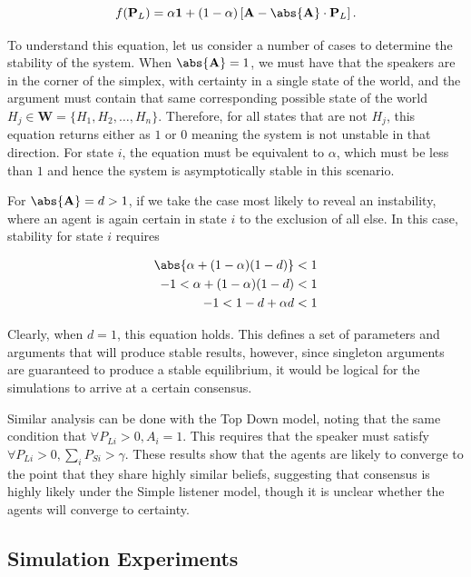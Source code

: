 \begin{equation*}
    f(\mathbf{P}_L) = \alpha \mathbf{1} + (1- \alpha) \left[ \mathbf{A} - \abs{ \mathbf{A}} \cdot \mathbf{P}_L \right] .
\end{equation*}

To understand this equation, let us consider a number of cases to determine the stability of the system. When $\abs{\mathbf{A}} = 1$, we must have that the speakers are in the corner of the simplex, with certainty in a single state of the world, and the argument must contain that same corresponding possible state of the world $H_j \in \mathbf{W} = \{H_1, H_2, \dots, H_n\}$. Therefore, for all states that are not $H_j$, this equation returns either as $1$ or $0$ meaning the system is not unstable in that direction. For state $i$, the equation must be equivalent to $\alpha$, which must be less than $1$ and hence the system is asymptotically stable in this scenario. 

For $\abs{\mathbf{A}} = d > 1$, if we take the case most likely to reveal an instability, where an agent is again certain in state $i$ to the exclusion of all else. In this case, stability for state $i$ requires 

\begin{align*}
    \abs{\alpha + (1 - \alpha)(1 - d)} < 1\\
    -1 < \alpha + (1 -\alpha ) (1 - d) < 1\\
    -1 < 1 - d + \alpha d < 1\\
\end{align*}

Clearly, when $d=1$, this equation holds. This defines a set of parameters and arguments that will produce stable results, however, since singleton arguments are guaranteed to produce a stable equilibrium, it would be logical for the simulations to arrive at a certain consensus. 

Similar analysis can be done with the Top Down model, noting that the same condition that $ \forall P_{Li} > 0, A_i = 1 $. This requires that the speaker must satisfy $ \forall P_{Li} > 0, \sum_i P_{Si}  > \gamma $. These results show that the agents are likely to converge to the point that they share highly similar beliefs, suggesting that consensus is highly likely under the Simple listener model, though it is unclear whether the agents will converge to certainty. 



\subsection{Simulation Experiments}

